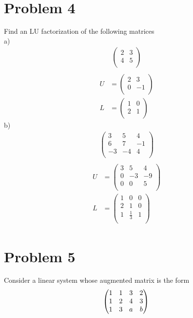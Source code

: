 \documentclass[]{article}
\begin{document}
\newpage
\section{Problem 4}
Find an LU factorization of the following matrices \\
a)
\begin{align*}
	\begin{pmatrix}
		2 & 3 \\
		4 & 5 \\
	\end{pmatrix} \\
\end{align*}
\begin{align*}
	U &= 
	\begin{pmatrix}
		2 & 3 \\
		0 &-1 \\
	\end{pmatrix} \\
	L &=
	\begin{pmatrix}
		1 & 0 \\
		2 & 1 \\
	\end{pmatrix}
\end{align*}
b)
\begin{align*}
	\begin{pmatrix}
		3 & 5 & 4 \\
		6 & 7 &-1 \\
		-3&-4 & 4 \\
	\end{pmatrix} \\
\end{align*}
\begin{align*}
	U &=
	\begin{pmatrix}
		3 & 5 & 4 \\
		0 &-3 &-9 \\
		0 & 0 & 5 \\
	\end{pmatrix} \\
	L &= 
	\begin{pmatrix}
		1 & 0 & 0 \\
		2 & 1 & 0 \\
		1 &\frac{1}{3} & 1 \\
	\end{pmatrix} \\
\end{align*}

\newpage
\section{Problem 5}
Consider a linear system whose augmented matrix is the form \\
$$
\begin{pmatrix}
	1 & 1 & 3 & 2 \\
	1 & 2 & 4 & 3 \\
	1 & 3 & a & b \\
\end{pmatrix} \\
$$
\end{document}
